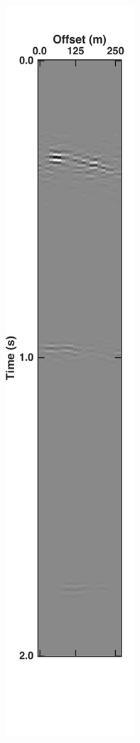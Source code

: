 \begin{figure}
\begin{subfigure}[t]{0.24\textwidth}
		\caption{}
		\label{fig:Ch-Results-Unbl-inline10}
	\end{subfigure}
	\centering
	\begin{subfigure}[t]{0.24\textwidth}
		\centering
		\includegraphics[height = 0.38\textheight]{Plots/BlendingPatterns/Deblended_xline10x}

\end{subfigure}
\end{figure}
